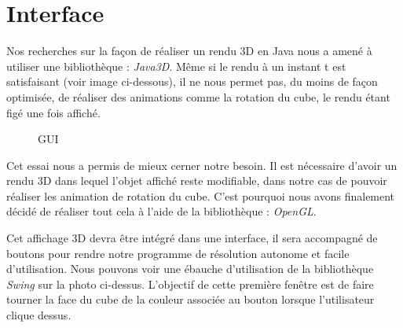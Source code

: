 \chapter{Interface}
Nos recherches sur la façon de réaliser un rendu 3D en Java nous a amené à utiliser une bibliothèque : \textit{Java3D}\cite{cite5}.
Même si le rendu à un instant t est satisfaisant (voir image ci-dessous), il ne nous permet pas, du moins de façon optimisée, de réaliser des animations comme la rotation du cube, le rendu étant figé une fois affiché.
\begin{figure}[h]
\begin{center}
\end{center}
\caption{GUI}
\end{figure}
Cet essai nous a permis de mieux cerner notre besoin. 
Il est nécessaire d'avoir un rendu 3D dans lequel l'objet affiché reste modifiable, dans notre cas de pouvoir réaliser les animation de rotation du cube. C'est pourquoi nous avons finalement décidé de réaliser tout cela à l'aide de la bibliothèque : \textit{OpenGL}\cite{cite6}.

Cet affichage 3D devra être intégré dans une interface, il sera accompagné de boutons pour rendre notre programme de résolution autonome et facile d'utilisation. Nous pouvons voir une ébauche d'utilisation de la bibliothèque \textit{Swing}\cite{cite9} sur la photo ci-dessus. L'objectif de cette première fenêtre est de faire tourner la face du cube de la couleur associée au bouton lorsque l'utilisateur clique dessus.

